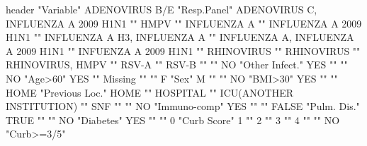 \documentclass{article}\usepackage[]{graphicx}\usepackage[]{color}
\begin{document}
header                              "Variable"     
ADENOVIRUS B/E                      "Resp.Panel"   
ADENOVIRUS C, INFLUENZA A 2009 H1N1 ""             
HMPV                                ""             
INFLUENZA A                         ""             
INFLUENZA A 2009 H1N1               ""             
INFLUENZA A H3, INFLUENZA A         ""             
INFLUENZA A, INFLUENZA A 2009 H1N1  ""             
INFUENZA A 2009 H1N1                ""             
RHINOVIRUS                          ""             
RHINOVIRUS                          ""             
RHINOVIRUS, HMPV                    ""             
RSV-A                               ""             
RSV-B                               ""             
                                    ""             
NO                                  "Other Infect."
YES                                 ""             
                                    ""             
NO                                  "Age>60"       
YES                                 ""             
Missing                             ""             
                                    ""             
F                                   "Sex"          
M                                   ""             
                                    ""             
NO                                  "BMI>30"       
YES                                 ""             
                                    ""             
HOME                                "Previous Loc."
HOME                                ""             
HOSPITAL                            ""             
ICU(ANOTHER INSTITUTION)            ""             
SNF                                 ""             
                                    ""             
NO                                  "Immuno-comp"  
YES                                 ""             
                                    ""             
FALSE                               "Pulm. Dis."   
TRUE                                ""             
                                    ""             
NO                                  "Diabetes"     
YES                                 ""             
                                    ""             
0                                   "Curb Score"   
1                                   ""             
2                                   ""             
3                                   ""             
4                                   ""             
                                    ""             
NO                                  "Curb>=3/5"    
\end{document}
